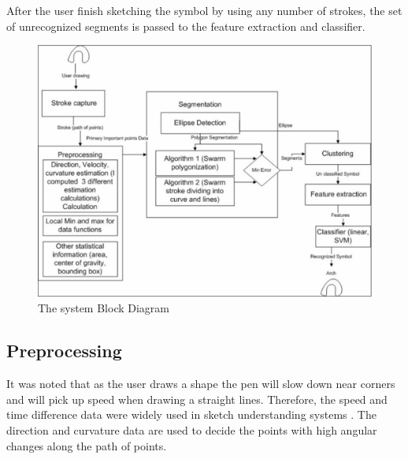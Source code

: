 \documentclass[a4paper,10pt]{IEEEconf}
\begin{document}
After the user finish sketching the symbol by using any number of strokes, the set of unrecognized segments is passed to the feature extraction and classifier.%
\begin{figure}[]
	\centering
		\includegraphics[scale=0.35]{images/Blockdiagram.pdf}
	\caption[  ]{The system Block Diagram}
	\label{fig:Blockdiagram}
\end{figure}
\subsection{Preprocessing}
\label{Prepross}
 It was noted that as the user draws a shape the pen will slow down near corners and will pick up speed when drawing a straight lines. Therefore, the speed and time difference data were widely used in sketch understanding systems \cite{earlyprocess}.  The direction and curvature data are used to decide the points with high angular changes along the path of points\cite{meanshift10}.  \\
 
\end{document}

